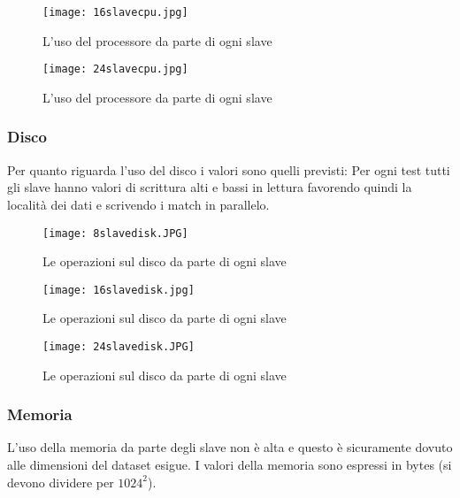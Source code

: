 \begin{figure}
  \begin{center}
    \texttt{[image: 16slavecpu.jpg]}
    \caption{L'uso del processore da parte di ogni slave}
    \label{fig:16slavecpu.jpg}
  \end{center}
\end{figure}

\begin{figure}
  \begin{center}
    \texttt{[image: 24slavecpu.jpg]}
    \caption{L'uso del processore da parte di ogni slave}
    \label{fig:24slavecpu.jpg}
  \end{center}
\end{figure}

\subsubsection{Disco}
Per quanto riguarda l'uso del disco i valori sono quelli previsti: Per ogni test tutti gli slave hanno valori di scrittura alti e bassi in lettura favorendo quindi la località dei dati e scrivendo i match in parallelo.

\begin{figure}
  \begin{center}
    \texttt{[image: 8slavedisk.JPG]}
    \caption{Le operazioni sul disco da parte di ogni slave}
    \label{fig:8slavedisk.jpg}
  \end{center}
\end{figure}

\begin{figure}
  \begin{center}
    \texttt{[image: 16slavedisk.jpg]}
    \caption{Le operazioni sul disco da parte di ogni slave}
    \label{fig:16slavedisk.jpg}
  \end{center}
\end{figure}

\begin{figure}
  \begin{center}
    \texttt{[image: 24slavedisk.JPG]}
    \caption{Le operazioni sul disco da parte di ogni slave}
    \label{fig:24slavedisk.jpg}
  \end{center}
\end{figure}

\subsubsection{Memoria}
L'uso della memoria da parte degli slave non è alta e questo è sicuramente dovuto alle dimensioni del dataset esigue. I valori della memoria sono espressi in bytes (si devono dividere per $1024^2$).
 
